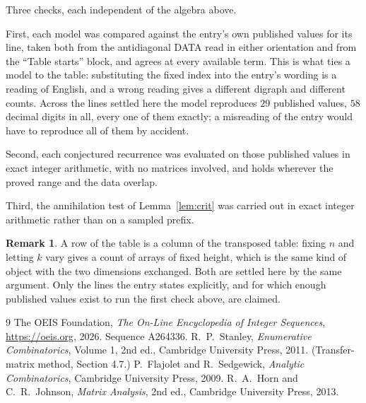 \documentclass[11pt,a4paper]{article}
\theoremstyle{plain}
\theoremstyle{definition}
\newtheorem{remark}[theorem]{Remark}
\begin{document}
Three checks, each independent of the algebra above.

First, each model was compared against the entry's own published values for its line, taken
both from the antidiagonal DATA read in either orientation and from the ``Table starts''
block, and agrees at every available term. This is what ties a model to the table:
substituting the fixed index into the entry's wording is a reading of English, and a wrong
reading gives a different digraph and different counts. Across the lines settled here the
model reproduces $29$ published values, $58$ decimal digits in all, every one of
them exactly; a misreading of the entry would have to reproduce all of them by accident.

Second, each conjectured recurrence was evaluated on those published values in exact
integer arithmetic, with no matrices involved, and holds wherever the proved range and the
data overlap.

Third, the annihilation test of Lemma~\ref{lem:crit} was carried out in exact integer
arithmetic rather than on a sampled prefix.

\begin{remark}
A row of the table is a column of the transposed table: fixing $n$ and letting $k$ vary gives a
count of arrays of fixed height, which is the same kind of object with the two dimensions
exchanged. Both are settled here by the same argument. Only the lines the entry states
explicitly, and for which enough published values exist to run the first check above, are
claimed.
\end{remark}

\begin{thebibliography}{9}
 The OEIS Foundation, \emph{The On-Line Encyclopedia of Integer
Sequences}, \url{https://oeis.org}, 2026. Sequence A264336.
 R.~P.~Stanley, \emph{Enumerative Combinatorics}, Volume 1, 2nd ed.,
Cambridge University Press, 2011. (Transfer-matrix method, Section 4.7.)
 P.~Flajolet and R.~Sedgewick, \emph{Analytic Combinatorics}, Cambridge
University Press, 2009.
 R.~A.~Horn and C.~R.~Johnson, \emph{Matrix Analysis}, 2nd ed., Cambridge
University Press, 2013.
\end{thebibliography}
\end{document}
